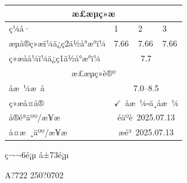 \documentclass[UTF8,10pt,a4paper,fontset=fandol]{ctexart}
\newcommand{\fieldvalue}[1]{#1}
\newcommand{\handwritten}[1]{#1}
\begin{document}
\begin{tabular}{|p{4cm}|p{3.8cm}|p{3.8cm}|p{3.8cm}|}
\hline
\multicolumn{4}{|c|}{æ£æµç»æ}
\\ \hline
ç¼å· & 1 & 2 & 3
\\ \hline
æµå®ç»æï¼ä¿ç2ä½å°æ°ï¼ &
\fieldvalue{\handwritten{7.66}} &
\fieldvalue{\handwritten{7.66}} &
\fieldvalue{\handwritten{7.66}}
\\ \hline
ç»æåå¼ï¼ä¿ç1ä½å°æ°ï¼ &
\multicolumn{3}{c|}{
\fieldvalue{\handwritten{7.7}}
}
\\ \hline
\multicolumn{4}{|c|}{æ£æµç»è®º}
\\ \hline
åæ ¼æ å & \multicolumn{3}{c|}{7.0--8.5}
\\ \hline
ç»æå¤å® &
\multicolumn{3}{c|}{
\fieldvalue{\ensuremath{\checkmark}\ åæ ¼}\qquad $\square$ä¸åæ ¼
}
\\ \hline
å®éªäºº/æ¥æ &
\multicolumn{3}{c|}{
\fieldvalue{\handwritten{éäºè\ 2025.07.13}}
}
\\ \hline
å¤æ ¸äºº/æ¥æ &
\multicolumn{3}{c|}{
\fieldvalue{\handwritten{æé³\ 2025.07.13}}
}
\\ \hline
\end{tabular}

\begin{center}
ç¬¬6é¡µ å±73é¡µ
\end{center}

\newpage

\handwritten{A?722 250?0702}
\end{document}
